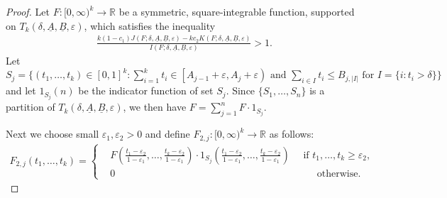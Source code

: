 \documentclass{amsart}
\numberwithin{equation}{section}
\begin{document}
\begin{proof}
Let $F:[0,\infty)^k\rightarrow \mathbb{R}$ be a symmetric, square-integrable function, supported on $T_k(\delta,\underline{A},\underline{B},\varepsilon)$, which satisfies the inequality
\begin{align} \label{inequ:intstep1}
\frac{k (1-c_1) J(F;\delta,\underline{A},\underline{B},\varepsilon) - kc_2 K(F;\delta,\underline{A},\underline{B},\varepsilon)}{I(F;\delta,\underline{A},\underline{B},\varepsilon)} > 1.
\end{align}
Let $S_j = \{(t_1, \dots, t_k) \in [0,1]^k:     \sum_{i=1}^k t_i \in \left[A_{j-1}+\varepsilon,  A_j+\varepsilon \right) \mbox{ and }  \sum_{i \in I} t_i \leq B_{j,|I|} \mbox{ for }  I=\{i: t_i > \delta\} \}$ and let $1_{S_j}(n)$ be the indicator function of set $S_j$. Since $\{S_1, \dots, S_n\}$ is a partition of $T_k(\delta,\underline{A},\underline{B},\varepsilon)$, we  then have  $F= \sum_{j=1}^n F \cdot 1_{S_j}$.  

\medskip
 
Next we choose   small $\varepsilon_1, \varepsilon_2>0$ and define $F_{2,j}:[0,\infty)^k\rightarrow \mathbb{R}$ as follows:
\begin{align*}
F_{2,j}(t_1,\dots,t_k)=\begin{cases} &F\left(\frac{t_1-\varepsilon_2}{1-\varepsilon_1},\dots,\frac{t_k-\varepsilon_2}{1-\varepsilon_1}\right) \cdot 1_{S_j}\!\left(\frac{t_1-\varepsilon_2}{1-\varepsilon_1},\dots,\frac{t_k-\varepsilon_2}{1-\varepsilon_1}\right) \quad  \mbox{ if } t_1, \dots, t_k \geq \varepsilon_2, \\
& 0 \qquad\qquad\qquad\qquad\qquad\qquad\qquad\qquad\qquad\qquad \mbox{ otherwise.} \end{cases}
\end{align*}


\end{proof}
\end{document}
